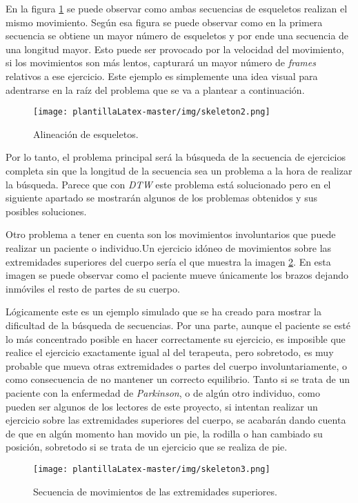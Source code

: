 En la figura \ref{fig:skeletonFrame} se puede observar como ambas secuencias de esqueletos realizan el mismo movimiento. Según esa figura se puede observar como en la primera secuencia se obtiene un mayor número de esqueletos y por ende una secuencia de una longitud mayor. Esto puede ser provocado por la velocidad del movimiento, si los movimientos son más lentos, capturará un mayor número de \textit{frames} relativos a ese ejercicio. Este ejemplo es simplemente una idea visual para adentrarse en la raíz del problema que se va a plantear a continuación. 

\begin{figure}[H]
    \centering
    \texttt{[image: plantillaLatex-master/img/skeleton2.png]}
    \caption{Alineación de esqueletos.}
    \label{fig:skeletonFrame}
\end{figure}

Por lo tanto, el problema principal será la búsqueda de la secuencia de ejercicios completa sin que la longitud de la secuencia sea un problema a la hora de realizar la búsqueda. Parece que con \emph{DTW} este problema está solucionado pero en el siguiente apartado se mostrarán algunos de los problemas obtenidos y sus posibles soluciones.

Otro problema a tener en cuenta son los movimientos involuntarios que puede realizar un paciente o individuo.Un ejercicio idóneo de movimientos sobre las extremidades superiores del cuerpo sería el que muestra la imagen \ref{f:f_esq_}. En esta imagen se puede observar como el paciente mueve únicamente los brazos dejando inmóviles el resto de partes de su cuerpo.

Lógicamente este es un ejemplo simulado que se ha creado para mostrar la dificultad de la búsqueda de secuencias. Por una parte, aunque el paciente se esté lo más concentrado posible en hacer correctamente su ejercicio, es imposible que realice el ejercicio exactamente igual al del terapeuta, pero sobretodo, es muy probable que mueva otras extremidades o partes del cuerpo involuntariamente, o como consecuencia de no mantener un correcto equilibrio. Tanto si se trata de un paciente con la enfermedad de \textit{Parkinson}, o de algún otro individuo, como pueden ser algunos de los lectores de este proyecto, si intentan realizar un ejercicio sobre las extremidades superiores del cuerpo, se acabarán dando cuenta de que en algún momento han movido un pie, la rodilla o han cambiado su posición, sobretodo si se trata de un ejercicio que se realiza de pie.
\begin{figure}[H]
    \centering
    \texttt{[image: plantillaLatex-master/img/skeleton3.png]}
    \caption{Secuencia de movimientos de las extremidades superiores.}
    \label{f:f_esq_}
\end{figure}

